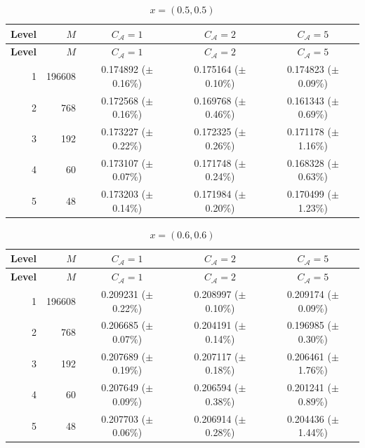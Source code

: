 \documentclass[11pt]{article}
\theoremstyle{definition}
\theoremstyle{plain}
\begin{document}
\begin{appendices}
\begin{longtable}{@{}r r c c c@{}}
\caption{$x=(0.5,0.5)$}\label{tab:mlp-x05}\\
\toprule
\textbf{Level} & \textbf{$M$} & \textbf{$C_{\mathcal A}=1$} & \textbf{$C_{\mathcal A}=2$} & \textbf{$C_{\mathcal A}=5$} \\
\midrule
\endfirsthead
\toprule
\textbf{Level} & \textbf{$M$} & \textbf{$C_{\mathcal A}=1$} & \textbf{$C_{\mathcal A}=2$} & \textbf{$C_{\mathcal A}=5$} \\
\midrule
\endhead
1 & 196608 & 0.174892 (\(\pm\) 0.16\%) & 0.175164 (\(\pm\) 0.10\%) & 0.174823 (\(\pm\) 0.09\%) \\
2 & 768    & 0.172568 (\(\pm\) 0.16\%) & 0.169768 (\(\pm\) 0.46\%) & 0.161343 (\(\pm\) 0.69\%) \\
3 & 192    & 0.173227 (\(\pm\) 0.22\%) & 0.172325 (\(\pm\) 0.26\%) & 0.171178 (\(\pm\) 1.16\%) \\
4 & 60     & 0.173107 (\(\pm\) 0.07\%) & 0.171748 (\(\pm\) 0.24\%) & 0.168328 (\(\pm\) 0.63\%) \\
5 & 48     & 0.173203 (\(\pm\) 0.14\%) & 0.171984 (\(\pm\) 0.20\%) & 0.170499 (\(\pm\) 1.23\%) \\
\bottomrule
\end{longtable}

\begin{longtable}{@{}r r c c c@{}}
\caption{$x=(0.6,0.6)$}\label{tab:mlp-x06}\\
\toprule
\textbf{Level} & \textbf{$M$} & \textbf{$C_{\mathcal A}=1$} & \textbf{$C_{\mathcal A}=2$} & \textbf{$C_{\mathcal A}=5$} \\
\midrule
\endfirsthead
\toprule
\textbf{Level} & \textbf{$M$} & \textbf{$C_{\mathcal A}=1$} & \textbf{$C_{\mathcal A}=2$} & \textbf{$C_{\mathcal A}=5$} \\
\midrule
\endhead
1 & 196608 & 0.209231 (\(\pm\) 0.22\%) & 0.208997 (\(\pm\) 0.10\%) & 0.209174 (\(\pm\) 0.09\%) \\
2 & 768    & 0.206685 (\(\pm\) 0.07\%) & 0.204191 (\(\pm\) 0.14\%) & 0.196985 (\(\pm\) 0.30\%) \\
3 & 192    & 0.207689 (\(\pm\) 0.19\%) & 0.207117 (\(\pm\) 0.18\%) & 0.206461 (\(\pm\) 1.76\%) \\
4 & 60     & 0.207649 (\(\pm\) 0.09\%) & 0.206594 (\(\pm\) 0.38\%) & 0.201241 (\(\pm\) 0.89\%) \\
5 & 48     & 0.207703 (\(\pm\) 0.06\%) & 0.206914 (\(\pm\) 0.28\%) & 0.204436 (\(\pm\) 1.44\%) \\
\bottomrule
\end{longtable}


\end{appendices}
\end{document}
